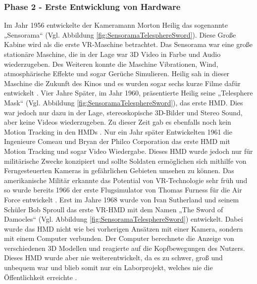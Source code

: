 \subsubsection{Phase 2 - Erste Entwicklung von Hardware}
Im Jahr 1956 entwickelte der Kameramann Morton Heilig das sogenannte „Sensorama“ (Vgl. Abbildung \ref{fig:SensoramaTelesphereSword}). Diese Große Kabine wird als die erste VR-Maschine betrachtet. Das Sensorama war eine große stationäre Maschine, die in der Lage war 3D Video in Farbe und Audio wiederzugeben. Des Weiteren konnte die Maschine Vibrationen, Wind, atmosphärische Effekte und sogar Gerüche Simulieren. Heilig sah in dieser Maschine die Zukunft des Kinos und es wurden sogar sechs kurze Filme dafür entwickelt \cite{20}.
\newline
Vier Jahre Später, im Jahr 1960, präsentierte Heilig seine „Telesphere Mask“ (Vgl. Abbildung \ref{fig:SensoramaTelesphereSword}), das erste HMD. Dies war jedoch nur dazu in der Lage, stereoskopische 3D-Bilder und Stereo Sound, aber keine Videos wiederzugeben. Zu dieser Zeit gab es ebenfalls noch kein Motion Tracking in den HMDs \cite{20}.
\newline
Nur ein Jahr später Entwickelten 1961 die Ingenieure Comeau und Bryan der Philco Corporation das erste HMD mit Motion Tracking und sogar Video Wiedergabe. Dieses HMD wurde jedoch nur für militärische Zwecke konzipiert und sollte Soldaten ermöglichen sich mithilfe von Ferngesteuerten Kameras in gefährlichen Gebieten umsehen zu können. Das amerikanische Militär erkannte das Potential von VR-Technologie sehr früh und so wurde bereits 1966 der erste Flugsimulator von Thomas Furness für die Air Force entwickelt \cite{20}.
\newline
Erst im Jahre 1968 wurde von Ivan Sutherland und seinem Schüler Bob Sproull das erste VR-HMD mit dem Namen „The Sword of Damocles“ (Vgl. Abbildung \ref{fig:SensoramaTelesphereSword}) entwickelt. Dabei wurde das HMD nicht wie bei vorherigen Ansätzen mit einer Kamera, sondern mit einem Computer verbunden. Der Computer berechnete die Anzeige von verschiedenen 3D Modellen und reagierte auf die Kopfbewegungen des Nutzers. Dieses HMD wurde aber nie weiterentwickelt, da es zu schwer, groß und unbequem war und blieb somit nur ein Laborprojekt, welches nie die Öffentlichkeit erreichte \cite{20}.
